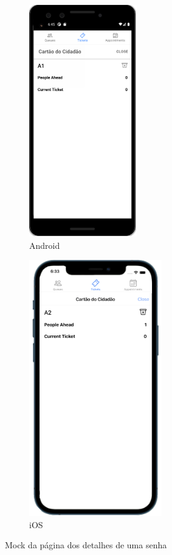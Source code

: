 \documentclass[12pt,a4paper]{article}
\begin{document}
\begin{figure}
\centering
\begin{subfigure}[h]{0.5\textwidth}
  \centering
  \includegraphics[scale=0.65]{mockTicketDetailsAndroid}
  \caption{Android}
  \label{fig:ticketDetailsAndroid}
\end{subfigure}%
\begin{subfigure}[h]{0.5\textwidth}
  \centering
  \includegraphics[scale=0.55]{mockTicketDetailsIOS}
  \caption{iOS}
  \label{fig:ticketDetailsIos}
\end{subfigure}
\caption{Mock da página dos detalhes de uma senha}
\label{fig:mockTicketDetails}
\end{figure}
\end{document}
